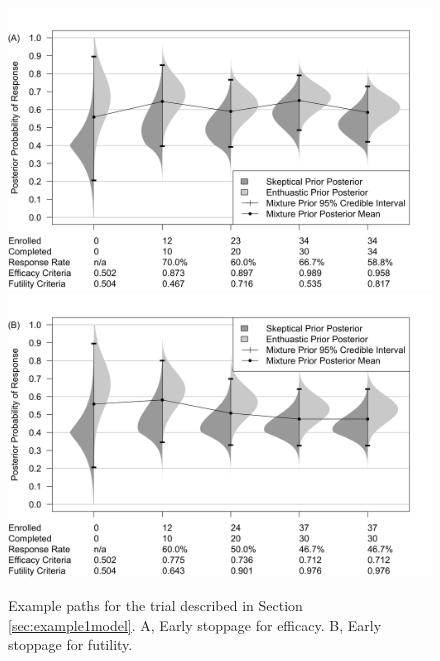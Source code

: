 \documentclass[AMA,STIX1COL,doublespace]{WileyNJD-v2}
\begin{document}
\begin{figure}
\begin{center}
    \includegraphics[width=6in]{figure2a.png}
    \includegraphics[width=6in]{figure2b.png}
    \caption{Example paths for the trial described in Section \ref{sec:example1model}. A, Early stoppage for efficacy. B, Early stoppage for futility.}
	\label{fig:figure2}
\end{center}
\end{figure}
\end{document}
